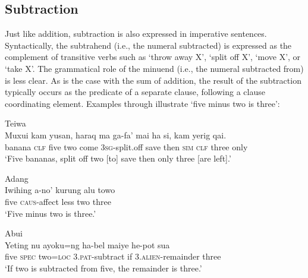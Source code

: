  

  

\subsection{Subtraction}
\label{sec:8:Subtraction}
Just like addition, subtraction is also expressed in imperative sentences. Syntactically, the subtrahend (i.e., the numeral subtracted) is expressed as the complement of transitive verbs such as `throw away X', `split off X', `move X', or `take X'. The grammatical role of the minuend (i.e., the numeral subtracted from) is less clear. As is the case with the sum of addition, the result of the subtraction typically occurs as the predicate of a separate clause, following a clause coordinating element. Examples  through  illustrate `five minus two is three':


 

\ea
\label{ex:8:1240}
{\upshape Teiwa}\\
 \gll Muxui  kam  yusan,     haraq  ma  ga-fa'   mai   ha  si,{\hspace{2cm}}  kam  yerig   qai.      \\
    banana  \textsc{clf}  five   two  come  \textsc{3sg-}split.off  save  then  \textsc{sim}  \textsc{clf} three  only    \\
 \glt `Five bananas,    split off two [to] save then only three [are left].' 
\z
 
\ea
\label{ex:8:1241}
{\upshape Adang}\\ 
\gll Iwihing  a-no'   kurung  alu  towo\\
 five  \textsc{caus}{}-affect  less  two  three\\
\glt `Five minus two is three.' 
\z  


\ea
\label{ex:8:1242}
{\upshape Abui}\\
 \gll Yeting  nu  ayoku=ng  ha-bel  maiye  he-pot  sua\\
  five  \textsc{spec}   two=\textsc{loc} 3.\textsc{pat}{}-subtract  if  \textsc{3.alien}{}-remainder  three \\
 \glt `If two is subtracted from five, the remainder is three.' 
\z 
  
